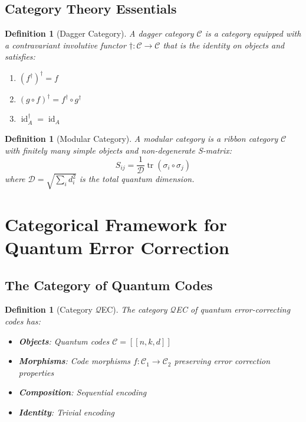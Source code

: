 \documentclass[12pt,a4paper]{article}
\newtheorem{definition}[theorem]{Definition}
\DeclareMathOperator{\tr}{tr}
\DeclareMathOperator{\id}{id}
\begin{document}
\subsection{Category Theory Essentials}

\begin{definition}[Dagger Category]
A dagger category $\mathcal{C}$ is a category equipped with a contravariant involutive functor $\dagger: \mathcal{C} \to \mathcal{C}$ that is the identity on objects and satisfies:
\begin{enumerate}
\item $(f^\dagger)^\dagger = f$
\item $(g \circ f)^\dagger = f^\dagger \circ g^\dagger$
\item $\id_A^\dagger = \id_A$
\end{enumerate}
\end{definition}

\begin{definition}[Modular Category]
A modular category is a ribbon category $\mathcal{C}$ with finitely many simple objects and non-degenerate S-matrix:
\[
S_{ij} = \frac{1}{\mathcal{D}} \tr(\sigma_i \circ \sigma_j)
\]
where $\mathcal{D} = \sqrt{\sum_i d_i^2}$ is the total quantum dimension.
\end{definition}

\section{Categorical Framework for Quantum Error Correction}

\subsection{The Category of Quantum Codes}

\begin{definition}[Category $\mathcal{Q}$EC]
The category $\mathcal{Q}$EC of quantum error-correcting codes has:
\begin{itemize}
\item \textbf{Objects}: Quantum codes $\mathcal{C} = [[n, k, d]]$
\item \textbf{Morphisms}: Code morphisms $f: \mathcal{C}_1 \to \mathcal{C}_2$ preserving error correction properties
\item \textbf{Composition}: Sequential encoding
\item \textbf{Identity}: Trivial encoding
\end{itemize}
\end{definition}
\end{document}

